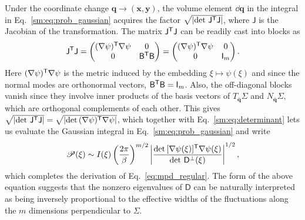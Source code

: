 Under the coordinate change $\bm{q} \to (\bm{x},\bm{y})$, the volume element $\dd{\bm{q}}$ in the integral in Eq.~\eqref{sm:eq:prob_gaussian} acquires the factor $\sqrt{\lvert\det\,\mathsf{J}^\mathsf{T}\mathsf{J}\rvert}$, where $\mathsf{J}$ is the Jacobian of the transformation.
The matrix $\mathsf{J}^\mathsf{T}\mathsf{J}$ can be readily cast into blocks as
%
\begin{equation}
  \mathsf{J}^\mathsf{T}\mathsf{J} =
  \begin{pmatrix}
    (\nabla\psi)^\mathsf{T}\nabla\psi & 0 \\
    0 & \mathsf{B}^\mathsf{T}\mathsf{B}
  \end{pmatrix}
  =
  \begin{pmatrix}
    (\nabla\psi)^\mathsf{T}\nabla\psi & 0 \\
    0 & \mathsf{I}_{m}
  \end{pmatrix}.
\end{equation}
%
Here $(\nabla\psi)^\mathsf{T}\nabla\psi$ is the metric induced by the embedding $\xi \mapsto \psi(\xi)$ and since the normal modes are orthonormal vectors, $\mathsf{B} ^\mathsf{T}\mathsf{B}  = \mathsf{I}_m$.
Also, the off-diagonal blocks vanish since they involve inner products of the basis vectors of $T_{\bar{\bm{q}}}\Sigma$ and $N_{\bar{\bm{q}}}\Sigma$, which are orthogonal complements of each other.
This gives $\sqrt{\lvert\det\,\mathsf{J}^\mathsf{T}\mathsf{J}\rvert} = \sqrt{\lvert\det\, (\nabla\psi)^\mathsf{T}\nabla\psi\rvert}$, which together with Eq.~\eqref{sm:eq:determinant} lets us evaluate the Gaussian integral in Eq.~\eqref{sm:eq:prob_gaussian} and write
%
\begin{equation}
  \mathscr{P}(\xi) \sim I(\xi)\left(\frac{2\pi}{\beta}\right)^{m/2}
  \left|\frac{\det\,[\nabla\psi(\xi)]^\mathsf{T}\nabla\psi(\xi)}{\det\,\mathsf{D}^{\perp}(\xi)}\right|^{1/2},
\end{equation}
which completes the derivation of Eq.~\eqref{eq:mpd_regular}.
The form of the above equation suggests that the nonzero eigenvalues of $\mathsf{D}$ can be naturally interpreted as being inversely proportional to the effective widths of the fluctuations along the $m$ dimensions perpendicular to $\Sigma$.
%
